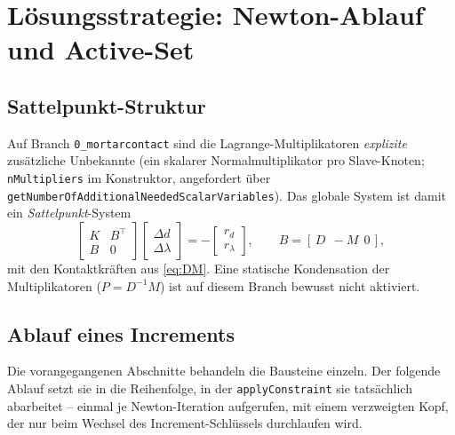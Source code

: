 \documentclass[a4paper,11pt]{article}
\def\bm#1{#1}%
\newcommand{\code}[1]{\texttt{\small #1}}
\let\stdsection\section
\renewcommand{\section}{\clearpage\stdsection}
\begin{document}
\section{Lösungsstrategie: Newton-Ablauf und Active-Set}
\label{sec:loesung}

\subsection{Sattelpunkt-Struktur}
Auf Branch \code{0\_mortarcontact} sind die Lagrange-Multiplikatoren \emph{explizite} zusätzliche
Unbekannte (ein skalarer Normalmultiplikator pro Slave-Knoten; \code{nMultipliers} im Konstruktor,
angefordert über \code{getNumberOfAdditionalNeededScalarVariables}). Das globale System ist damit
ein \emph{Sattelpunkt}-System
\begin{equation}
\begin{bmatrix} \bm K & \bm B^\top \\ \bm B & \bm 0 \end{bmatrix}
\begin{bmatrix} \Delta\bm d \\ \Delta\bm\lambda \end{bmatrix}
= -\begin{bmatrix} \bm r_d \\ \bm r_\lambda \end{bmatrix},
\qquad \bm B = [\,\bm D\ \ -\bm M\ \ \bm 0\,],
\end{equation}
mit den Kontaktkräften aus \eqref{eq:DM}. Eine statische Kondensation der Multiplikatoren
($\bm P=\bm D^{-1}\bm M$) ist auf diesem Branch bewusst nicht aktiviert.

\subsection{Ablauf eines Increments}
\label{sec:ablauf}
Die vorangegangenen Abschnitte behandeln die Bausteine einzeln. Der folgende Ablauf setzt sie in
die Reihenfolge, in der \code{applyConstraint} sie tatsächlich abarbeitet -- einmal je
Newton-Iteration aufgerufen, mit einem verzweigten Kopf, der nur beim Wechsel des
Increment-Schlüssels durchlaufen wird.
\end{document}
